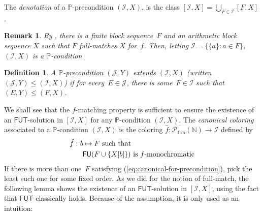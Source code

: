 \documentclass{article}
\def\PP{\mathbb{P}}
\def\J{\mathcal{J}}
\def\I{\mathcal{I}}
\newcommand{\FUT}[0]{\mathsf{FUT}}
\newcommand{\NN}[0]{\mathbb{N}}
\newcommand{\Pfin}{\mathcal{P}_{\mathtt{fin}}}
\newcommand{\FU}[0]{\mathsf{FU}} %
\numberwithin{theorem}{section}
\newtheorem{remark}[theorem]{Remark}
\newtheorem{definition}[theorem]{Definition}
\begin{document}
The \emph{denotation} of a $\PP$-precondition $(\I, X)$, is the class $[\I, X] = \bigcup_{F \in \I} [F, X]$.


\begin{remark}
By , there is a finite block sequence~$F$ and an arithmetic block sequence $X$
such that $F$ full-matches $X$ for~$f$.
Then, letting $\I = \{ \{a\} : a \in F \}$, $(\I, X)$ is a $\PP$-condition.
\end{remark}

\begin{definition}
A $\PP$-precondition $(\J, Y)$ \emph{extends} $(\I, X)$ (written $(\J, Y) \leq (\I, X)$) if for every~$E \in \J$, there is some~$F \in \I$ such that $(E, Y) \leq (F, X)$. 
\end{definition}

We shall see that the $f$-matching property is sufficient to ensure the existence of an $\FUT$-solution in $[\I, X]$ for any $\PP$-condition $(\I, X)$.
The \emph{canonical coloring} associated to a $\PP$-condition $(\I, X)$ is the coloring $\hat f : \Pfin(\NN) \to \I$ defined by
\begin{align}\label{eq:canonical-for-precondition}
\hat f :\ & b \mapsto F \text{ such that } \notag \\
 & \text{ $\FU(F \cup \{X[b]\})$ is $f$-monochromatic}
\end{align}
If there is more than one~$F$ satisfying (\ref{eq:canonical-for-precondition}), pick the least such one for some fixed order.
As we did for the notion of full-match, the following lemma shows the existence of an $\FUT$-solution in $[\I, X]$, using the fact that $\FUT$ classically holds. Because of the assumption, it is only used as an intuition:
\end{document}
